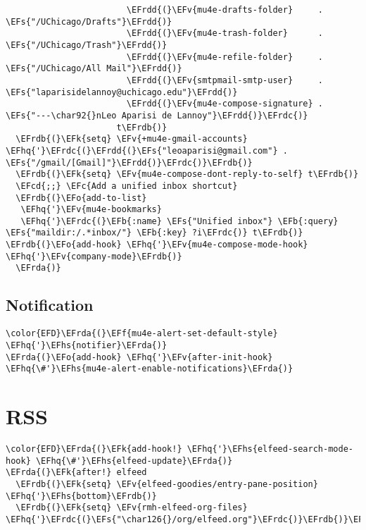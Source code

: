 \documentclass[c]{article}
\theoremstyle{plain}%
\theoremstyle{definition}
\theoremstyle{remark}
\newcommand{\EFc}[1]{\textcolor{EFc}{#1}} %
\newcommand{\EFcd}[1]{\textcolor{EFcd}{#1}} %
\newcommand{\EFs}[1]{\textcolor{EFs}{#1}} %
\newcommand{\EFk}[1]{\textcolor{EFk}{#1}} %
\newcommand{\EFb}[1]{\textcolor{EFb}{#1}} %
\newcommand{\EFf}[1]{\textcolor{EFf}{#1}} %
\newcommand{\EFv}[1]{\textcolor{EFv}{#1}} %
\newcommand{\EFo}[1]{\textcolor{EFo}{#1}} %
\newcommand{\EFhq}[1]{\textcolor{EFhq}{#1}} %
\newcommand{\EFhs}[1]{\textcolor{EFhs}{#1}} %
\newcommand{\EFrda}[1]{\textcolor{EFrda}{#1}} %
\newcommand{\EFrdb}[1]{\textcolor{EFrdb}{#1}} %
\newcommand{\EFrdc}[1]{\textcolor{EFrdc}{#1}} %
\newcommand{\EFrdd}[1]{\textcolor{EFrdd}{#1}} %
\begin{document}
\begin{Code}
\begin{Verbatim}
                        \EFrdd{(}\EFv{mu4e-drafts-folder}     . \EFs{"/UChicago/Drafts"}\EFrdd{)}
                        \EFrdd{(}\EFv{mu4e-trash-folder}      . \EFs{"/UChicago/Trash"}\EFrdd{)}
                        \EFrdd{(}\EFv{mu4e-refile-folder}     . \EFs{"/UChicago/All Mail"}\EFrdd{)}
                        \EFrdd{(}\EFv{smtpmail-smtp-user}     . \EFs{"laparisidelannoy@uchicago.edu"}\EFrdd{)}
                        \EFrdd{(}\EFv{mu4e-compose-signature} . \EFs{"---\char92{}nLeo Aparisi de Lannoy"}\EFrdd{)}\EFrdc{)}
                      t\EFrdb{)}
  \EFrdb{(}\EFk{setq} \EFv{+mu4e-gmail-accounts} \EFhq{'}\EFrdc{(}\EFrdd{(}\EFs{"leoaparisi@gmail.com"} . \EFs{"/gmail/[Gmail]"}\EFrdd{)}\EFrdc{)}\EFrdb{)}
  \EFrdb{(}\EFk{setq} \EFv{mu4e-compose-dont-reply-to-self} t\EFrdb{)}
  \EFcd{;;} \EFc{Add a unified inbox shortcut}
  \EFrdb{(}\EFo{add-to-list}
   \EFhq{'}\EFv{mu4e-bookmarks}
   \EFhq{'}\EFrdc{(}\EFb{:name} \EFs{"Unified inbox"} \EFb{:query} \EFs{"maildir:/.*inbox/"} \EFb{:key} ?i\EFrdc{)} t\EFrdb{)}
\EFrdb{(}\EFo{add-hook} \EFhq{'}\EFv{mu4e-compose-mode-hook} \EFhq{'}\EFv{company-mode}\EFrdb{)}
  \EFrda{)}
\end{Verbatim}
\end{Code}
\subsection{Notification}
\label{sec:orga46b245}
\begin{Code}
\begin{Verbatim}
\color{EFD}\EFrda{(}\EFf{mu4e-alert-set-default-style} \EFhq{'}\EFhs{notifier}\EFrda{)}
\EFrda{(}\EFo{add-hook} \EFhq{'}\EFv{after-init-hook} \EFhq{\#'}\EFhs{mu4e-alert-enable-notifications}\EFrda{)}
\end{Verbatim}
\end{Code}
\section{RSS}
\label{sec:org08d8c42}
\begin{Code}
\begin{Verbatim}
\color{EFD}\EFrda{(}\EFk{add-hook!} \EFhq{'}\EFhs{elfeed-search-mode-hook} \EFhq{\#'}\EFhs{elfeed-update}\EFrda{)}
\EFrda{(}\EFk{after!} elfeed
  \EFrdb{(}\EFk{setq} \EFv{elfeed-goodies/entry-pane-position} \EFhq{'}\EFhs{bottom}\EFrdb{)}
  \EFrdb{(}\EFk{setq} \EFv{rmh-elfeed-org-files} \EFhq{'}\EFrdc{(}\EFs{"\char126{}/org/elfeed.org"}\EFrdc{)}\EFrdb{)}\EFrda{)}
\end{Verbatim}
\end{Code}
\end{document}

